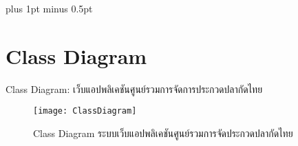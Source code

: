 
\clearpage
\thispagestyle{plain}

\begingroup
\fontsize{16pt}{19.2pt}\selectfont
\justifying
\XeTeXlinebreakskip=0pt plus 1pt minus 0.5pt
\setlength{\parindent}{1.5cm}
\setlength{\parskip}{0pt}


\section*{Class Diagram}

\indent Class Diagram: เว็บแอปพลิเคชันศูนย์รวมการจัดการประกวดปลากัดไทย

\vspace{\baselineskip}

\begin{figure}[h]
	\centering
	\texttt{[image: ClassDiagram]}
	\caption{Class Diagram ระบบเว็บแอปพลิเคชันศูนย์รวมการจัดประกวดปลากัดไทย}
\end{figure}

\clearpage